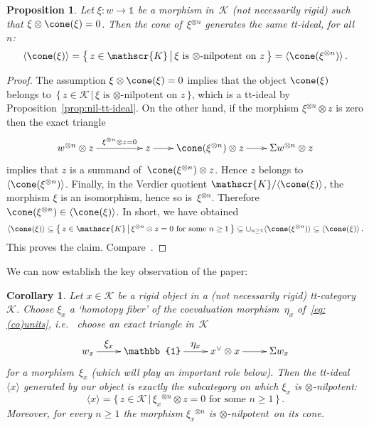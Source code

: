 \documentclass{amsart}
\numberwithin{equation}{section}
\newtheorem{Cor}[equation]{Corollary}
\newtheorem{Prop}[equation]{Proposition}
\theoremstyle{remark}
\begin{document}
\begin{Prop}
\label{prop:spectra^3}Let $\xi\colon w\to {\mathbb{1}}$ be a morphism in~${\mathscr{{K}}}$ (not necessarily rigid) such that $\xi\otimes\cone(\xi)=0$. Then the cone of~$\xi{^{\otimes {n}}}$ generates the same tt-ideal, for all~$n$:
\[
{\langle {\cone(\xi)}\rangle}={\big\{\,{z\in{\mathscr{{K}}}}\,\big|\,{\xi\textrm{ is {$\otimes$-nilpotent}\ on }z}\,\big\}}={\langle {\cone(\xi{^{\otimes {n}}})}\rangle}\,.
\]
\end{Prop}

\begin{proof}
The assumption $\xi\otimes \cone(\xi)=0$ implies that the object $\cone(\xi)$ belongs to~${\big\{\,{z\in{\mathscr{{K}}}}\,\big|\,{\xi\textrm{ is {$\otimes$-nilpotent}\ on }z}\,\big\}}$, which is a tt-ideal by Proposition~\ref{prop:nil-tt-ideal}. On the other hand, if the morphism $\xi{^{\otimes {n}}}\otimes z$ is zero then the exact triangle
\[
\xymatrix@C=2em{
w{^{\otimes {n}}}\otimes z \ar[rr]^-{\xi{^{\otimes {n}}}\otimes z=0}
&& z \ar[r]
& \cone(\xi{^{\otimes {n}}})\otimes z \ar[r]
& \Sigma w{^{\otimes {n}}}\otimes z
}
\]
implies that $z$ is a summand of~$\cone(\xi{^{\otimes {n}}})\otimes z$. Hence $z$ belongs to~${\langle {\cone(\xi{^{\otimes {n}}})}\rangle}$. Finally, in the Verdier quotient ${\mathscr{{K}}}/{\langle {\cone(\xi)}\rangle}$, the morphism $\xi$ is an isomorphism, hence so is~$\xi{^{\otimes {n}}}$. Therefore $\cone(\xi{^{\otimes {n}}})\in{\langle {\cone(\xi)}\rangle}$. In short, we have obtained
\[
{\langle {\cone(\xi)}\rangle} \subseteq {\big\{\,{z\in{\mathscr{{K}}}}\,\big|\,{\xi{^{\otimes {n}}}\otimes z=0\textrm{ for some }n\ge1}\,\big\}}\subseteq \cup_{n\ge1}{\langle {\cone(\xi{^{\otimes {n}}})}\rangle}
\subseteq{\langle {\cone(\xi)}\rangle}\,.
\]
This proves the claim. Compare~\cite[\S\,2]{Balmer10b}.
\end{proof}

We can now establish the key observation of the paper:
\begin{Cor}
\label{cor:key}Let $x\in{\mathscr{{K}}}$ be a rigid object in a (not necessarily rigid) tt-category~${\mathscr{{K}}}$. Choose $\xi_x$ a `homotopy fiber' of the coevaluation morphism~$\eta_x$ of~\eqref{eq:(co)units}, {{\sl i.e.}\ } choose an exact triangle in~${\mathscr{{K}}}$
\begin{equation}
\label{eq:triangle}
\xymatrix{
w_x \ar[r]^-{\displaystyle\xi_x}
& {\mathbb{1}} \ar[r]^-{\displaystyle\eta_x}
& x^\vee\otimes x \ar[r]^-{}
& \Sigma w_x
}
\end{equation}
for a morphism~$\xi_x$ (which will play an important role below). Then the tt-ideal ${\langle {x}\rangle}$ generated by our object is exactly the subcategory on which $\xi_x$ is $\otimes$-nilpotent:
\begin{equation}
\label{eq:key}{\langle {x}\rangle} = {\big\{\,{z\in{\mathscr{{K}}}}\,\big|\,{\xi_x{^{\otimes {n}}}\otimes z=0\textrm{ for some }n\ge1}\,\big\}}\,.
\end{equation}
Moreover, for every $n\ge1$ the morphism $\xi_x{^{\otimes {n}}}$ is {$\otimes$-nilpotent}\ on its cone.
\end{Cor}
\end{document}
